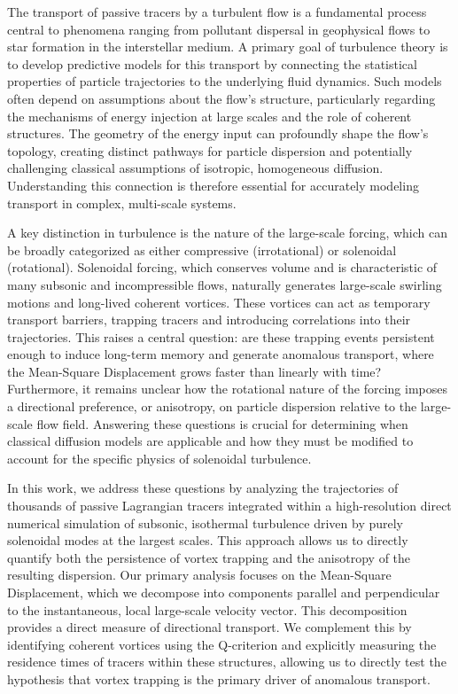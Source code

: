 \documentclass[]{article}
\begin{document}
The transport of passive tracers by a turbulent flow is a fundamental process central to phenomena ranging from pollutant dispersal in geophysical flows to star formation in the interstellar medium. A primary goal of turbulence theory is to develop predictive models for this transport by connecting the statistical properties of particle trajectories to the underlying fluid dynamics. Such models often depend on assumptions about the flow's structure, particularly regarding the mechanisms of energy injection at large scales and the role of coherent structures. The geometry of the energy input can profoundly shape the flow's topology, creating distinct pathways for particle dispersion and potentially challenging classical assumptions of isotropic, homogeneous diffusion. Understanding this connection is therefore essential for accurately modeling transport in complex, multi-scale systems.

A key distinction in turbulence is the nature of the large-scale forcing, which can be broadly categorized as either compressive (irrotational) or solenoidal (rotational). Solenoidal forcing, which conserves volume and is characteristic of many subsonic and incompressible flows, naturally generates large-scale swirling motions and long-lived coherent vortices. These vortices can act as temporary transport barriers, trapping tracers and introducing correlations into their trajectories. This raises a central question: are these trapping events persistent enough to induce long-term memory and generate anomalous transport, where the Mean-Square Displacement grows faster than linearly with time? Furthermore, it remains unclear how the rotational nature of the forcing imposes a directional preference, or anisotropy, on particle dispersion relative to the large-scale flow field. Answering these questions is crucial for determining when classical diffusion models are applicable and how they must be modified to account for the specific physics of solenoidal turbulence.

In this work, we address these questions by analyzing the trajectories of thousands of passive Lagrangian tracers integrated within a high-resolution direct numerical simulation of subsonic, isothermal turbulence driven by purely solenoidal modes at the largest scales. This approach allows us to directly quantify both the persistence of vortex trapping and the anisotropy of the resulting dispersion. Our primary analysis focuses on the Mean-Square Displacement, which we decompose into components parallel and perpendicular to the instantaneous, local large-scale velocity vector. This decomposition provides a direct measure of directional transport. We complement this by identifying coherent vortices using the Q-criterion and explicitly measuring the residence times of tracers within these structures, allowing us to directly test the hypothesis that vortex trapping is the primary driver of anomalous transport.
\end{document}
